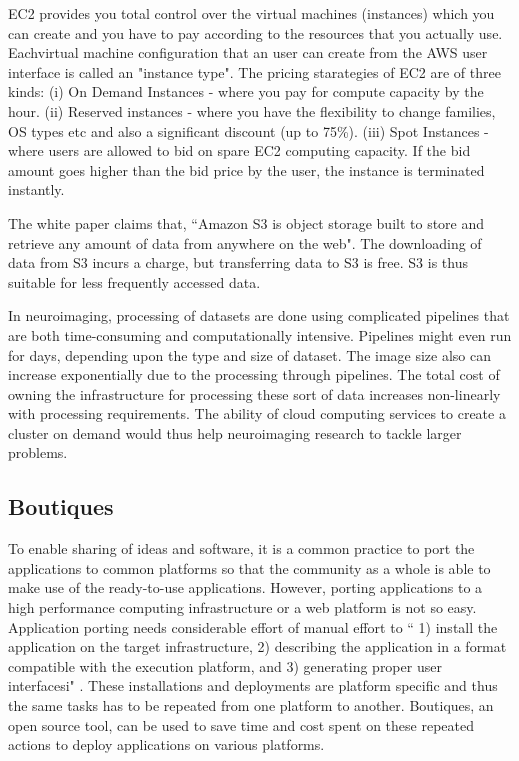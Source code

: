 EC2 provides you total control over the virtual machines (instances) which you can create and you have to pay according to the resources that you actually use. Eachvirtual machine configuration that an user can create from the AWS user interface is called an "instance type". The pricing starategies of EC2 are of three kinds: (i) On Demand Instances - where you pay for compute capacity by the hour. (ii) Reserved instances - where you have the flexibility to change families, OS types etc and also a significant discount (up to 75\%). (iii) Spot Instances - where users are allowed to bid on spare EC2 computing capacity. If the bid amount goes higher than the bid price by the user, the instance is terminated instantly.

The white paper \cite{Amazon-Web-Services} claims that, ``Amazon S3 is object storage built to store and retrieve any amount of data from anywhere on the web". The downloading of data from S3 incurs a charge, but transferring data to S3 is free. S3 is thus suitable for less frequently accessed data.

In neuroimaging, processing of datasets are done using complicated pipelines that are both time-consuming and computationally intensive. Pipelines might even run for days, depending upon the type and size of dataset. The image size also can increase exponentially due to the processing through pipelines. The total cost of owning the infrastructure for processing these sort of data increases non-linearly with processing requirements. The ability of cloud computing services to create a cluster on demand would thus help neuroimaging research to tackle larger problems.

\subsection{Boutiques}
To enable sharing of ideas and software, it is a common practice to port the applications to common platforms so that the community as a whole is able to make use of the ready-to-use applications. However, porting applications to a high performance computing infrastructure or a web platform is not so easy. Application porting needs considerable effort of manual effort to `` 1) install the application on the target infrastructure, 2) describing the application in a format compatible with the execution platform, and 3) generating proper user interfacesi" \cite{boutiques}. These installations and deployments are platform specific and thus the same tasks has to be repeated from one platform to another. Boutiques, an open source tool, can be used to save time and cost spent on these repeated actions to deploy applications on various platforms. 

